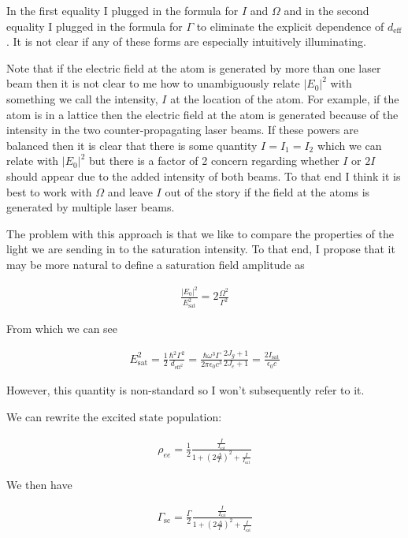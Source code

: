 \documentclass[12pt]{article}
\begin{document}
In the first equality I plugged in the formula for $I$ and $\Omega$ and in the second equality I plugged in the formula for $\Gamma$ to eliminate the explicit dependence of $d_{\text{eff}}$. It is not clear if any of these forms are especially intuitively illuminating. 

Note that if the electric field at the atom is generated by more than one laser beam then it is not clear to me how to unambiguously relate $|E_0|^2$ with something we call the intensity, $I$ at the location of the atom. For example, if the atom is in a lattice then the electric field at the atom is generated because of the intensity in the two counter-propagating laser beams. If these powers are balanced then it is clear that there is some quantity $I = I_1 = I_2$ which we can relate with $|E_0|^2$ but there is a factor of 2 concern regarding whether $I$ or $2I$ should appear due to the added intensity of both beams. To that end I think it is best to work with $\Omega$ and leave $I$ out of the story if the field at the atoms is generated by multiple laser beams.

The problem with this approach is that we like to compare the properties of the light we are sending in to the saturation intensity. To that end, I propose that it may be more natural to define a saturation field amplitude as

\begin{align}
\frac{|E_0|^2}{E_{\text{sat}}^2} = 2\frac{\Omega^2}{\Gamma^2}
\end{align}

From which we can see

\begin{align}
E_{\text{sat}}^2 = \frac{1}{2} \frac{\hbar^2 \Gamma^2}{d_{\text{eff}^2}} = \frac{\hbar \omega^3 \Gamma}{2 \pi \epsilon_0 c^3} \frac{2J_g+1}{2J_e+1} =  \frac{2I_{\text{sat}}}{\epsilon_0 c}
\end{align}

However, this quantity is non-standard so I won't subsequently refer to it.

We can rewrite the excited state population:

\begin{align}
\rho_{ee} = \frac{1}{2} \frac{\frac{I}{I_{\text{sat}}}}{1 + \left(2 \frac{\Delta}{\Gamma} \right)^2 + \frac{I}{I_{\text{sat}}}}
\end{align}

We then have

\begin{align}
\Gamma_{\text{sc}} = \frac{\Gamma}{2} \frac{\frac{I}{I_{\text{sat}}}}{1 + \left(2 \frac{\Delta}{\Gamma} \right)^2 + \frac{I}{I_{\text{sat}}}}
\end{align}
\end{document}
